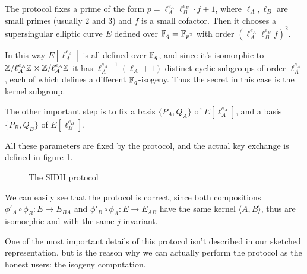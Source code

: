 The protocol fixes a prime of the form $p=\ell_A^{e_A}\ell_B^{e_B}\cdot f\pm1$, where $\ell_A,\ell_B$ are small primes (usually $2$ and $3$) and $f$ is a small cofactor. Then it chooses a supersingular elliptic curve $E$ defined over $\mathbb{F}_q=\mathbb{F}_{p^2}$ with order $(\ell_A^{e_A}\ell_B^{e_B} f)^2$.

In this way $E[\ell_A^{e_A}]$ is all defined over $\mathbb{F}_q$, and since it's isomorphic to $\mathbb{Z}/\ell_A^{e_A}\mathbb{Z}\times\mathbb{Z}/\ell_A^{e_A}\mathbb{Z}$ it has $\ell_A^{e_A-1}(\ell_A+1)$ distinct cyclic subgroups of order $\ell_A^{e_A}$, each of which defines a different $\mathbb{F}_q$-isogeny. Thus the secret in this case is the kernel subgroup.

The other important step is to fix a basis $\{ P_A,Q_A \}$ of $E[\ell_A^{e_A}]$, and a basis $\{ P_B, Q_B \}$ of $E[\ell_B^{e_B}]$.

All these parameters are fixed by the protocol, and the actual key exchange is defined in figure \ref{prot_SIDH}.

\begin{figure}
    \caption{The SIDH protocol}
    \label{prot_SIDH}
\end{figure}

We can easily see that the protocol is correct, since both compositions $\phi'_A\circ\phi_B:E\to E_{BA}$ and $\phi'_B\circ\phi_A:E\to E_{AB}$ have the same kernel $\langle A,B\rangle$, thus are isomorphic and with the same $j$-invariant.

One of the most important details of this protocol isn't described in our sketched representation, but is the reason why we can actually perform the protocol as the honest users: the isogeny computation.

